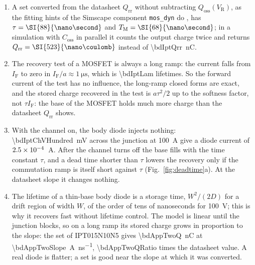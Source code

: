 \documentclass[10pt,a4paper]{scrartcl}
\newcommand{\IF}{I_\mathrm{F}}
\newcommand{\VR}{V_\mathrm{R}}
\newcommand{\Qrr}{Q_\mathrm{rr}}
\newcommand{\Qoss}{Q_\mathrm{oss}}
\newcommand{\Coss}{C_\mathrm{oss}}
\newcommand{\TM}{T_\mathrm{M}}
\newcommand{\IPT}{IPT015N10N5}
\begin{document}
\begin{enumerate}
\item A set converted from the datasheet $\Qrr$ without subtracting $\Qoss(\VR)$, as the fitting hints of the Simscape component \texttt{mos\_dyn} do \cite{mosdyn}, has $\tau = \SI{\bdIptNTau}{\nano\second}$ and $\TM = \SI{\bdIptNTm}{\nano\second}$; in a simulation with $\Coss$ in parallel it counts the output charge twice and returns $\Qrr = \SI{\bdIptNSimQrr}{\nano\coulomb}$ instead of \SI{\bdIptQrr}{\nano\coulomb}.
\item The recovery test of a MOSFET is always a long ramp: the current falls from $\IF$ to zero in $\IF/a \approx \SI{1}{\micro\second}$, which is \num{\bdIptLam} lifetimes. So the forward current of the test has no influence, the long-ramp closed forms are exact, and the stored charge recovered in the test is $a\tau^2/2$ up to the softness factor, not $\tau\IF$: the base of the MOSFET holds much more charge than the datasheet $\Qrr$ shows.
\item With the channel on, the body diode injects nothing: \SI{\bdIptChVHundred}{\milli\volt} across the junction at \SI{100}{\ampere} give a diode current of $2.5\times10^{-4}$~A. After the channel turns off the base fills with the time constant $\tau$, and a dead time shorter than $\tau$ lowers the recovery only if the commutation ramp is itself short against $\tau$ (Fig.~\ref{fig:deadtime}a). At the datasheet slope it changes nothing.
\item The lifetime of a thin-base body diode is a storage time, $W^2/(2D)$ for a drift region of width $W$, of the order of tens of nanoseconds for \SI{100}{\volt}; this is why it recovers fast without lifetime control. The model is linear until the junction blocks, so on a long ramp its stored charge grows in proportion to the slope: the set of \IPT{} gives \SI{\bdAppTwoQ}{\nano\coulomb} at \SI{\bdAppTwoSlope}{\ampere\per\nano\second}, \num{\bdAppTwoQRatio} times the datasheet value. A real diode is flatter; a set is good near the slope at which it was converted.
\end{enumerate}

\end{document}
